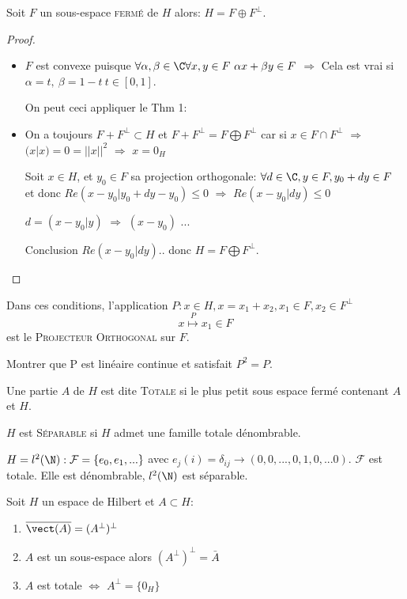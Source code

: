 \begin{theorem}[corollaire]
	Soit $F$ un sous-espace \textsc{fermé} de $H$ alors: $H=F\oplus F^\perp$.
\end{theorem}
\begin{proof}
	\begin{itemize}
		\item $F$ est convexe puisque $\forall \alpha,\beta\in\C \forall x, y\in F\ \alpha x+\beta y\in F$ $\Rightarrow$ Cela est vrai si $\alpha = t,\ \beta=1-t\ t\in[0,1]$.
	
	On peut ceci appliquer le Thm 1:
		\item On a toujours $F+F^\perp \subset H$ et $F+F^\perp = F\bigoplus F^\perp$ car si $x\in F\cap F^\perp$ $\Rightarrow$ $(x|x)=0=||x||^2$ $\Rightarrow$ $x=0_H$
		
		Soit $x\in H$, et $y_0\in F$ sa projection orthogonale: $\forall d\in \C, y\in F, y_0+dy\in F$ et donc $Re(x-y_0| y_0+dy-y_0)\leq 0$ $\Rightarrow$ $Re(x-y_0|dy)\leq 0$
		
		$d=(x-y_0|y)$ $\Rightarrow$ $(x-y_0)$
		...
		
	Conclusion $Re(x-y_0|dy)$.. donc $H=F\bigoplus F^\perp$.
	\end{itemize}
\end{proof}

\begin{definition}
	Dans ces conditions, l'application $P:x\in H, x=x_1+x_2, x_1\in F, x_2\in F^\perp $ $$x \overset{P}{\mapsto} x_1\in F$$ est le \textsc{Projecteur Orthogonal} sur $F$.
\end{definition}

\begin{examplebox}
	Montrer que P est linéaire continue et satisfait $P^2=P$.
\end{examplebox}

\begin{definition}
	Une partie $A$ de $H$ est dite \textsc{Totale} si le plus petit sous espace fermé contenant $A$ et $H$.

	$H$ est \textsc{Séparable} si $H$ admet une famille totale dénombrable.
\end{definition}

\begin{example}
	$H=l^2(\N): \mathcal{F}=\{e_0, e_1, ...\}$ avec $e_j(i)=\delta_{ij}\to (0,0,..., 0,1,0,... 0)$. $\mathcal{F}$ est totale. Elle est dénombrable, $l^2(\N)$ est séparable.
\end{example}

\begin{theorem}
	Soit $H$ un espace de Hilbert et $A\subset H$:
	\begin{enumerate}
		\item $\overline{\vect(A)}=(A^\perp)^\perp$
		\item $A$ est un sous-espace alors $(A^\perp)^\perp=\bar A$
		\item $A$ est totale $\Leftrightarrow$ $A^\perp=\{0_H\}$
	\end{enumerate}
\end{theorem}

